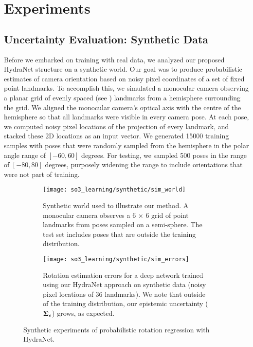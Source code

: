 \section{Experiments}
\subsection{Uncertainty Evaluation: Synthetic Data}

Before we embarked on training with real data, we analyzed our proposed HydraNet structure on a synthetic world. Our goal was to produce probabilistic estimates of camera orientation based on noisy pixel coordinates of a set of fixed point landmarks. To accomplish this, we simulated a monocular camera observing a planar grid of evenly spaced (see ) landmarks from a hemisphere surrounding the grid. We aligned the monocular camera's optical axis with the centre of the hemisphere so that all landmarks were visible in every camera pose. At each pose, we computed noisy pixel locations of the projection of every landmark, and stacked these 2D locations as an input vector. We generated 15000 training samples with poses that were randomly sampled from the hemisphere in the polar angle range of $[-60, 60]$ degrees. For testing, we sampled 500 poses in the range of $[-80, 80]$ degrees, purposely widening the range to include orientations that were not part of training. 

\begin{figure}
	\centering 
	\begin{subfigure}[]{\textwidth}
		\texttt{[image: so3\_learning/synthetic/sim\_world]}
	\caption{Synthetic world used to illustrate our method. A monocular camera observes a 6 $\times$ 6 grid of point landmarks from poses sampled on a semi-sphere. The test set includes poses that are outside the training distribution.}
	\label{fig:synthetic_world}
	\end{subfigure}
	\begin{subfigure}[]{\textwidth}
	\texttt{[image: so3\_learning/synthetic/sim\_errors]}
	\caption{Rotation estimation errors for a deep network trained using our HydraNet approach on synthetic data (noisy pixel locations of 36 landmarks). We note that outside of the training distribution, our epistemic uncertainty ($\boldsymbol{\mathbf{\Sigma}}_e$) grows, as expected.}
	\label{fig:sim_errors}
	\end{subfigure}
	\caption{Synthetic experiments of probabilistic rotation regression with HydraNet.}
\end{figure}

